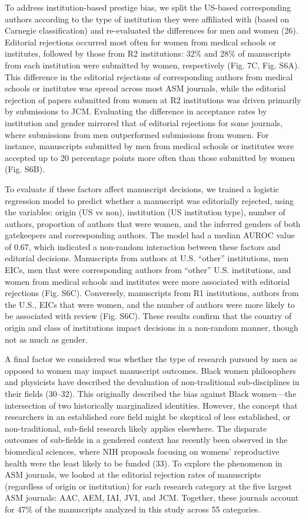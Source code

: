 \documentclass[11pt,]{article}
\begin{document}
To address institution-based prestige bias, we split the US-based
corresponding authors according to the type of institution they were
affiliated with (based on Carnegie classification) and re-evaluated the
differences for men and women (26). Editorial rejections occurred most
often for women from medical schools or institutes, followed by those
from R2 institutions: 32\% and 28\% of manuscripts from each institution
were submitted by women, respectively (Fig. 7C, Fig. S6A). This
difference in the editorial rejections of corresponding authors from
medical schools or institutes was spread across most ASM journals, while
the editorial rejection of papers submitted from women at R2
institutions was driven primarily by submissions to JCM. Evaluating the
difference in acceptance rates by institution and gender mirrored that
of editorial rejections for some journals, where submissions from men
outperformed submissions from women. For instance, manuscripts submitted
by men from medical schools or institutes were accepted up to 20
percentage points more often than those submitted by women (Fig. S6B).

To evaluate if these factors affect manuscript decisions, we trained a
logistic regression model to predict whether a manuscript was
editorially rejected, using the variables: origin (US vs non),
institution (US institution type), number of authors, proportion of
authors that were women, and the inferred genders of both gatekeepers
and corresponding authors. The model had a median AUROC value of 0.67,
which indicated a non-random interaction between these factors and
editorial decisions. Manuscripts from authors at U.S. ``other''
institutions, men EICs, men that were corresponding authors from
``other'' U.S. institutions, and women from medical schools and
institutes were more associated with editorial rejections (Fig. S6C).
Conversely, manuscripts from R1 institutions, authors from the U.S.,
EICs that were women, and the number of authors were more likely to be
associated with review (Fig. S6C). These results confirm that the
country of origin and class of institutions impact decisions in a
non-random manner, though not as much as gender.

A final factor we considered was whether the type of research pursued by
men as opposed to women may impact manuscript outcomes. Black women
philosophers and physicists have described the devaluation of
non-traditional sub-disciplines in their fields (30--32). This
originally described the bias against Black women---the intersection of
two historically marginalized identities. However, the concept that
researchers in an established core field might be skeptical of less
established, or non-traditional, sub-field research likely applies
elsewhere. The disparate outcomes of sub-fields in a gendered context
has recently been observed in the biomedical sciences, where NIH
proposals focusing on womens' reproductive health were the least likely
to be funded (33). To explore the phenomenon in ASM journals, we looked
at the editorial rejection rates of manuscripts (regardless of origin or
institution) for each research category at the five largest ASM
journals: AAC, AEM, IAI, JVI, and JCM. Together, these journals account
for 47\% of the manuscripts analyzed in this study across 55 categories.
\end{document}
